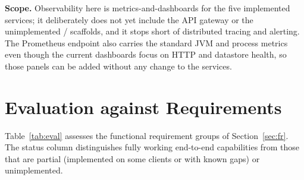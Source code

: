 \begin{notebox}
\textbf{Scope.} Observability here is metrics-and-dashboards for the five
implemented services; it deliberately does not yet include the API gateway or the
unimplemented / scaffolds, and it stops short of
distributed tracing and alerting. The Prometheus endpoint also carries the
standard JVM and process metrics even though the current dashboards focus on HTTP
and datastore health, so those panels can be added without any change to the
services.
\end{notebox}

\section{Evaluation against Requirements}

Table~\ref{tab:eval} assesses the functional requirement groups of
Section~\ref{sec:fr}. The status column distinguishes fully working end-to-end
capabilities from those that are partial (implemented on some clients or with
known gaps) or unimplemented.

